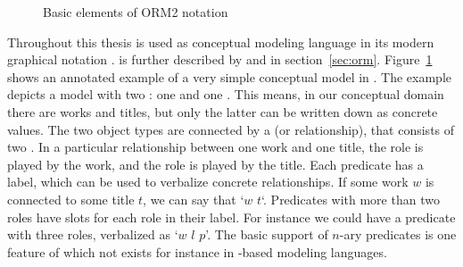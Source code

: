 \begin{figure}[b]
\centering
{}
\caption{Basic elements of ORM2 notation}
\label{fig:orm2basics}
\end{figure}

Throughout this thesis  is used as conceptual
modeling language in its modern graphical notation .  is
further described by \textcite{Halpin2008} and in section~\ref{sec:orm}. 
Figure~\ref{fig:orm2basics} shows an annotated example of a very simple 
conceptual model in .
%
The example depicts a model with two : one 
  and one  
. This means, in our conceptual domain there are works
and titles, but only the latter can be written down as concrete values. 
The two object types are connected by a 
(or relationship), that consists of two . 
In a particular relationship between one work and one title, the 
role  is played by the work, and the role 
 is played by the title. Each predicate has a label,
which can be used to verbalize concrete
relationships. If some work $w$ is connected to some title $t$, we
can say that `$w$  $t$`. Predicates with more than
two roles have slots for each role in their label. For instance we 
could have a predicate with three roles, verbalized as
`$w$  $l$  $p$'. The basic 
support of $n$-ary predicates is one feature of  which 
not exists for instance in -based modeling languages.

